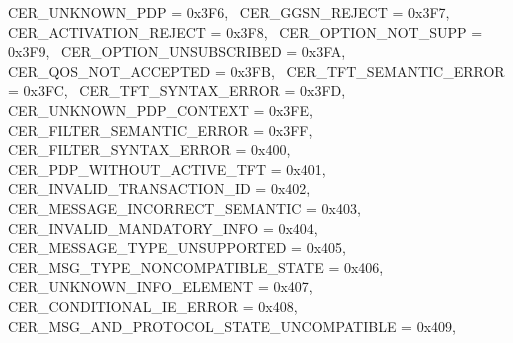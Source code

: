 \begin{DoxyItemize}
 C\+E\+R\+\_\+\+U\+N\+K\+N\+O\+W\+N\+\_\+\+P\+DP = 0x3\+F6,~\newline
 C\+E\+R\+\_\+\+G\+G\+S\+N\+\_\+\+R\+E\+J\+E\+CT = 0x3\+F7,~\newline
 C\+E\+R\+\_\+\+A\+C\+T\+I\+V\+A\+T\+I\+O\+N\+\_\+\+R\+E\+J\+E\+CT = 0x3\+F8,~\newline
 C\+E\+R\+\_\+\+O\+P\+T\+I\+O\+N\+\_\+\+N\+O\+T\+\_\+\+S\+U\+PP = 0x3\+F9,~\newline
 C\+E\+R\+\_\+\+O\+P\+T\+I\+O\+N\+\_\+\+U\+N\+S\+U\+B\+S\+C\+R\+I\+B\+ED = 0x3\+FA,~\newline
 C\+E\+R\+\_\+\+Q\+O\+S\+\_\+\+N\+O\+T\+\_\+\+A\+C\+C\+E\+P\+T\+ED = 0x3\+FB,~\newline
 C\+E\+R\+\_\+\+T\+F\+T\+\_\+\+S\+E\+M\+A\+N\+T\+I\+C\+\_\+\+E\+R\+R\+OR = 0x3\+FC,~\newline
 C\+E\+R\+\_\+\+T\+F\+T\+\_\+\+S\+Y\+N\+T\+A\+X\+\_\+\+E\+R\+R\+OR = 0x3\+FD,~\newline
 C\+E\+R\+\_\+\+U\+N\+K\+N\+O\+W\+N\+\_\+\+P\+D\+P\+\_\+\+C\+O\+N\+T\+E\+XT = 0x3\+FE,~\newline
 C\+E\+R\+\_\+\+F\+I\+L\+T\+E\+R\+\_\+\+S\+E\+M\+A\+N\+T\+I\+C\+\_\+\+E\+R\+R\+OR = 0x3\+FF,~\newline
 C\+E\+R\+\_\+\+F\+I\+L\+T\+E\+R\+\_\+\+S\+Y\+N\+T\+A\+X\+\_\+\+E\+R\+R\+OR = 0x400,~\newline
 C\+E\+R\+\_\+\+P\+D\+P\+\_\+\+W\+I\+T\+H\+O\+U\+T\+\_\+\+A\+C\+T\+I\+V\+E\+\_\+\+T\+FT = 0x401,~\newline
 C\+E\+R\+\_\+\+I\+N\+V\+A\+L\+I\+D\+\_\+\+T\+R\+A\+N\+S\+A\+C\+T\+I\+O\+N\+\_\+\+ID = 0x402,~\newline
 C\+E\+R\+\_\+\+M\+E\+S\+S\+A\+G\+E\+\_\+\+I\+N\+C\+O\+R\+R\+E\+C\+T\+\_\+\+S\+E\+M\+A\+N\+T\+IC = 0x403,~\newline
 C\+E\+R\+\_\+\+I\+N\+V\+A\+L\+I\+D\+\_\+\+M\+A\+N\+D\+A\+T\+O\+R\+Y\+\_\+\+I\+N\+FO = 0x404,~\newline
 C\+E\+R\+\_\+\+M\+E\+S\+S\+A\+G\+E\+\_\+\+T\+Y\+P\+E\+\_\+\+U\+N\+S\+U\+P\+P\+O\+R\+T\+ED = 0x405,~\newline
 C\+E\+R\+\_\+\+M\+S\+G\+\_\+\+T\+Y\+P\+E\+\_\+\+N\+O\+N\+C\+O\+M\+P\+A\+T\+I\+B\+L\+E\+\_\+\+S\+T\+A\+TE = 0x406,~\newline
 C\+E\+R\+\_\+\+U\+N\+K\+N\+O\+W\+N\+\_\+\+I\+N\+F\+O\+\_\+\+E\+L\+E\+M\+E\+NT = 0x407,~\newline
 C\+E\+R\+\_\+\+C\+O\+N\+D\+I\+T\+I\+O\+N\+A\+L\+\_\+\+I\+E\+\_\+\+E\+R\+R\+OR = 0x408,~\newline
 C\+E\+R\+\_\+\+M\+S\+G\+\_\+\+A\+N\+D\+\_\+\+P\+R\+O\+T\+O\+C\+O\+L\+\_\+\+S\+T\+A\+T\+E\+\_\+\+U\+N\+C\+O\+M\+P\+A\+T\+I\+B\+LE = 0x409,~\newline

\end{DoxyItemize}
